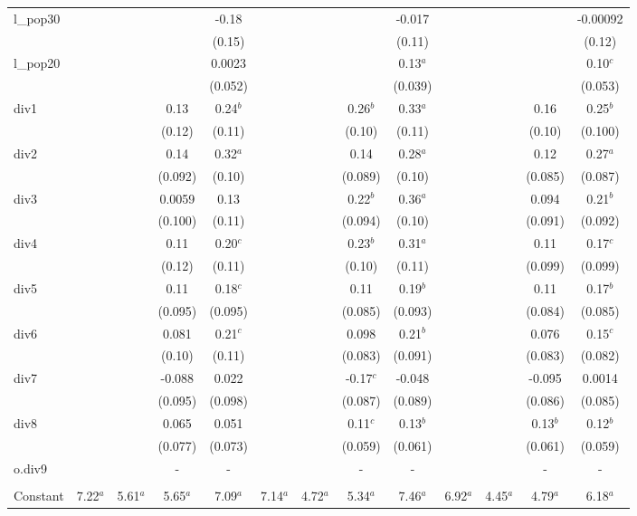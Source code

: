 \documentclass[]{article}
\begin{document}
\begin{tabular}{lcccccccccccc}
l\_pop30 &  &  &  & -0.18 &  &  &  & -0.017 &  &  &  & -0.00092 \\
 &  &  &  & (0.15) &  &  &  & (0.11) &  &  &  & (0.12) \\
l\_pop20 &  &  &  & 0.0023 &  &  &  & 0.13$^a$ &  &  &  & 0.10$^c$ \\
 &  &  &  & (0.052) &  &  &  & (0.039) &  &  &  & (0.053) \\
div1 &  &  & 0.13 & 0.24$^b$ &  &  & 0.26$^b$ & 0.33$^a$ &  &  & 0.16 & 0.25$^b$ \\
 &  &  & (0.12) & (0.11) &  &  & (0.10) & (0.11) &  &  & (0.10) & (0.100) \\
div2 &  &  & 0.14 & 0.32$^a$ &  &  & 0.14 & 0.28$^a$ &  &  & 0.12 & 0.27$^a$ \\
 &  &  & (0.092) & (0.10) &  &  & (0.089) & (0.10) &  &  & (0.085) & (0.087) \\
div3 &  &  & 0.0059 & 0.13 &  &  & 0.22$^b$ & 0.36$^a$ &  &  & 0.094 & 0.21$^b$ \\
 &  &  & (0.100) & (0.11) &  &  & (0.094) & (0.10) &  &  & (0.091) & (0.092) \\
div4 &  &  & 0.11 & 0.20$^c$ &  &  & 0.23$^b$ & 0.31$^a$ &  &  & 0.11 & 0.17$^c$ \\
 &  &  & (0.12) & (0.11) &  &  & (0.10) & (0.11) &  &  & (0.099) & (0.099) \\
div5 &  &  & 0.11 & 0.18$^c$ &  &  & 0.11 & 0.19$^b$ &  &  & 0.11 & 0.17$^b$ \\
 &  &  & (0.095) & (0.095) &  &  & (0.085) & (0.093) &  &  & (0.084) & (0.085) \\
div6 &  &  & 0.081 & 0.21$^c$ &  &  & 0.098 & 0.21$^b$ &  &  & 0.076 & 0.15$^c$ \\
 &  &  & (0.10) & (0.11) &  &  & (0.083) & (0.091) &  &  & (0.083) & (0.082) \\
div7 &  &  & -0.088 & 0.022 &  &  & -0.17$^c$ & -0.048 &  &  & -0.095 & 0.0014 \\
 &  &  & (0.095) & (0.098) &  &  & (0.087) & (0.089) &  &  & (0.086) & (0.085) \\
div8 &  &  & 0.065 & 0.051 &  &  & 0.11$^c$ & 0.13$^b$ &  &  & 0.13$^b$ & 0.12$^b$ \\
 &  &  & (0.077) & (0.073) &  &  & (0.059) & (0.061) &  &  & (0.061) & (0.059) \\
o.div9 &  &  & - & - &  &  & - & - &  &  & - & - \\
 &  &  &  &  &  &  &  &  &  &  &  &  \\
Constant & 7.22$^a$ & 5.61$^a$ & 5.65$^a$ & 7.09$^a$ & 7.14$^a$ & 4.72$^a$ & 5.34$^a$ & 7.46$^a$ & 6.92$^a$ & 4.45$^a$ & 4.79$^a$ & 6.18$^a$ \\

\end{tabular}
\end{document}
